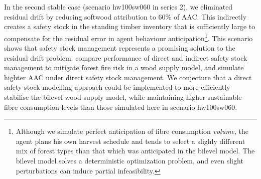In the second stable case (scenario hw100sw060 in series 2), we eliminated residual drift by reducing softwood attribution to 60\% of AAC. This indirectly creates a safety stock in the standing timber inventory that is sufficiently large to compensate for the residual error in agent behaviour anticipation\footnote{Although we simulate perfect anticipation of fibre consumption \emph{volume}, the agent plans his own harvest schedule and tends to select a slighly different mix of forest types than that which was anticipated in the bilevel model. The bilevel model solves a deterministic optimization problem, and even slight perturbations can induce partial infeasibility.}. This scenario shows that safety stock management represents a promising solution to the residual drift problem. \citet{raulier2014increasing} compare performance of direct and indirect safety stock management to mitigate forest fire risk in a wood supply model, and simulate highter AAC under direct safety stock management. We conjecture that a direct safety stock modelling approach could be implemented to more efficiently stabilise the bilevel wood supply model, while maintaining higher sustainable fibre consumption levels than those simulated here in scenario hw100sw060.